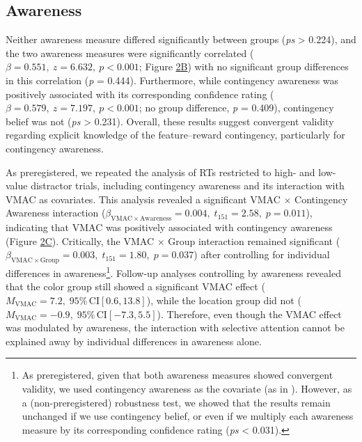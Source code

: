 \documentclass[
  man,
  floatsintext,
  longtable,
  nolmodern,
  notxfonts,
  notimes,
  mask,
  colorlinks=true,linkcolor=blue,citecolor=blue,urlcolor=blue]{apa7}
\begin{document}
\subsection{Awareness}\label{awareness}

Neither awareness measure differed significantly between groups
(\emph{ps} \textgreater{} 0.224), and the two awareness measures were
significantly correlated (\(\beta = 0.551,\ z = 6.632,\ p < 0.001\);
Figure \hyperref[fig-2]{2B}) with no significant group differences in
this correlation (\emph{p} = 0.444). Furthermore, while contingency
awareness was positively associated with its corresponding confidence
rating (\(\beta = 0.579,\ z = 7.197,\ p < 0.001\); no group difference,
\emph{p} = 0.409), contingency belief was not (\emph{ps} \textgreater{}
0.231). Overall, these results suggest convergent validity regarding
explicit knowledge of the feature--reward contingency, particularly for
contingency awareness.

As preregistered, we repeated the analysis of RTs restricted to high-
and low-value distractor trials, including contingency awareness and its
interaction with VMAC as covariates. This analysis revealed a
significant VMAC \(\times\) Contingency Awareness interaction
(\(\beta_{\mathrm{VMAC} \times \mathrm{Awareness}} = 0.004, \; t_{151} = 2.58, \; p = 0.011\)),
indicating that VMAC was positively associated with contingency
awareness (Figure \hyperref[fig-2]{2C}). Critically, the VMAC × Group
interaction remained significant
(\(\beta_{\mathrm{VMAC} \times \mathrm{Group}} = 0.003, \; t_{151} = 1.80, \; p = 0.037\))
after controlling for individual differences in awareness\footnote{As
  preregistered, given that both awareness measures showed convergent
  validity, we used contingency awareness as the covariate (as in
  ). However, as a (non-preregistered) robustness test, we showed
  that the results remain unchanged if we use contingency belief, or
  even if we multiply each awareness measure by its corresponding
  confidence rating (\emph{ps} \textless{} 0.031).}. Follow-up analyses
controlling by awareness revealed that the color group still showed a
significant VMAC effect
(\(M_{\mathrm{VMAC}} = 7.2,\;95\%\,\mathrm{CI}[0.6, 13.8]\)), while the
location group did not
(\(M_{\mathrm{VMAC}} = -0.9,\;95\%\,\mathrm{CI}[-7.3, 5.5]\)).
Therefore, even though the VMAC effect was modulated by awareness, the
interaction with selective attention cannot be explained away by
individual differences in awareness alone.
\end{document}
